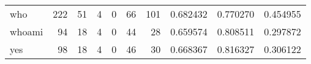 \begin{longtable}{lrrrrrrrrr}
who       &                                                222 &                                                 51 &                                                  4 &                                                  0 &                                                 66 &                                                101 &                                           0.682432 &                               0.770270 &                             0.454955 \\
whoami    &                                                 94 &                                                 18 &                                                  4 &                                                  0 &                                                 44 &                                                 28 &                                           0.659574 &                               0.808511 &                             0.297872 \\
yes       &                                                 98 &                                                 18 &                                                  4 &                                                  0 &                                                 46 &                                                 30 &                                           0.668367 &                               0.816327 &                             0.306122 \\
\end{longtable}
